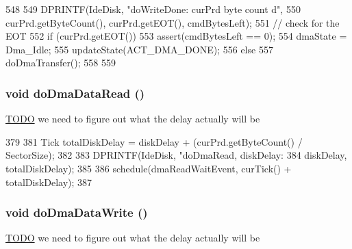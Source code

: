 \begin{DoxyCode}
548 {
549     DPRINTF(IdeDisk, "doWriteDone: curPrd byte count %
      d\n",
550                 curPrd.getByteCount(), curPrd.getEOT(), cmdBytesLeft);
551     // check for the EOT
552     if (curPrd.getEOT()) {
553         assert(cmdBytesLeft == 0);
554         dmaState = Dma_Idle;
555         updateState(ACT_DMA_DONE);
556     } else {
557         doDmaTransfer();
558     }
559 }
\end{DoxyCode}
\hypertarget{classIdeDisk_aac34c7bd9c30398a876820e7bf616b72}{
\subsubsection[{doDmaDataRead}]{\setlength{\rightskip}{0pt plus 5cm}void doDmaDataRead ()}}
\label{classIdeDisk_aac34c7bd9c30398a876820e7bf616b72}


\begin{Desc}
\item[\hyperlink{todo__todo000057}{TODO}]we need to figure out what the delay actually will be \end{Desc}



\begin{DoxyCode}
379 {
381     Tick totalDiskDelay = diskDelay + (curPrd.getByteCount() / SectorSize);
382 
383     DPRINTF(IdeDisk, "doDmaRead, diskDelay: %
384             diskDelay, totalDiskDelay);
385 
386     schedule(dmaReadWaitEvent, curTick() + totalDiskDelay);
387 }
\end{DoxyCode}
\hypertarget{classIdeDisk_ae0d5ccabc77ef46a2850230fcf2e44de}{
\subsubsection[{doDmaDataWrite}]{\setlength{\rightskip}{0pt plus 5cm}void doDmaDataWrite ()}}
\label{classIdeDisk_ae0d5ccabc77ef46a2850230fcf2e44de}


\begin{Desc}
\item[\hyperlink{todo__todo000058}{TODO}]we need to figure out what the delay actually will be \end{Desc}



